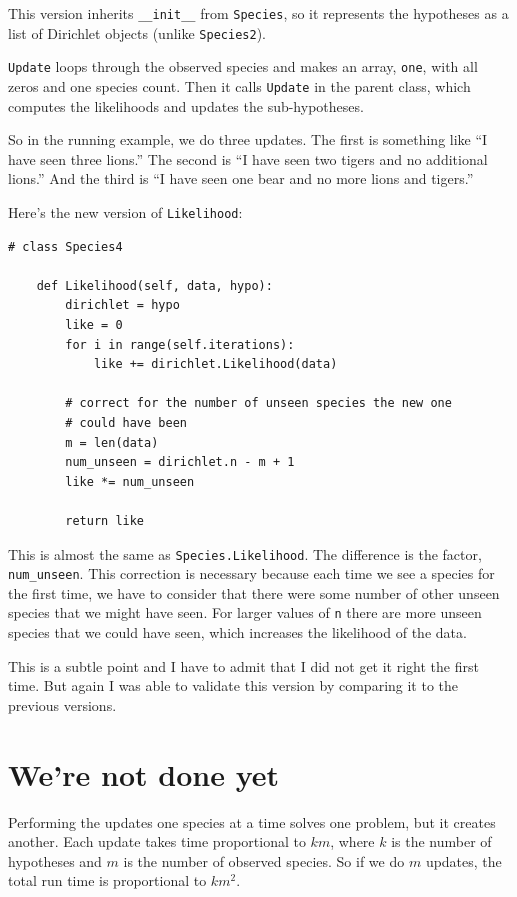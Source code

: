 \documentclass[12pt]{book}
\begin{document}
This version inherits \verb"__init__" from {\tt Species}, so it
represents the hypotheses as a list of Dirichlet objects (unlike
{\tt Species2}).

{\tt Update} loops through the observed species and makes an
array, {\tt one}, with all zeros and one species count.  Then
it calls {\tt Update} in the parent class, which computes
the likelihoods and updates the sub-hypotheses.

So in the running example, we do three updates.  The first
is something like ``I have seen three lions.''  The second is
``I have seen two tigers and no additional lions.''  And the third
is ``I have seen one bear and no more lions and tigers.''

Here's the new version of {\tt Likelihood}:

\begin{verbatim}
# class Species4

    def Likelihood(self, data, hypo):
        dirichlet = hypo
        like = 0
        for i in range(self.iterations):
            like += dirichlet.Likelihood(data)

        # correct for the number of unseen species the new one
        # could have been
        m = len(data)
        num_unseen = dirichlet.n - m + 1
        like *= num_unseen

        return like
\end{verbatim}

This is almost the same as {\tt Species.Likelihood}.  The difference
is the factor, \verb"num_unseen".  This correction is necessary
because each time we see a species for the first time, we have to
consider that there were some number of other unseen species that
we might have seen.  For larger values of {\tt n} there are more
unseen species that we could have seen, which increases the likelihood
of the data.

This is a subtle point and I have to admit that I did not get it right
the first time.  But again I was able to validate this version
by comparing it to the previous versions.


\section{We're not done yet}

\newcommand{\BigO}[1]{\mathcal{O}(#1)}

Performing the updates one species at a time solves one problem, but
it creates another.  Each update takes time proportional to $k m$,
where $k$ is the number of hypotheses and $m$ is the number of observed
species.  So if we do $m$ updates, the total run time is
proportional to $k m^2$. 
\end{document}
